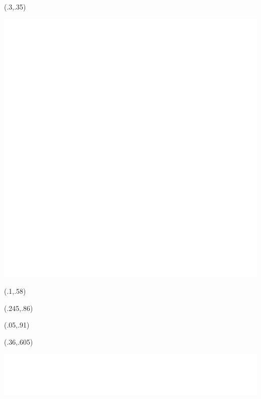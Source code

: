 \begin{textblock}{.4}(.3,.35)
	\begin{center}
		\includegraphics[width=.2\paperwidth]{images/unitologo}
	\end{center}
\end{textblock}

\begin{textblock}{.6}(.1,.58)
\end{textblock}


\begin{textblock}{.3}(.245,.86)
\end{textblock}

\begin{textblock}{.4}(.05,.91)
\end{textblock}

\begin{textblock}{.6}(.36,.605)
	\begin{center}
		\includegraphics[width=.575\paperwidth]{images/copertina1}
	\end{center}
\end{textblock}


